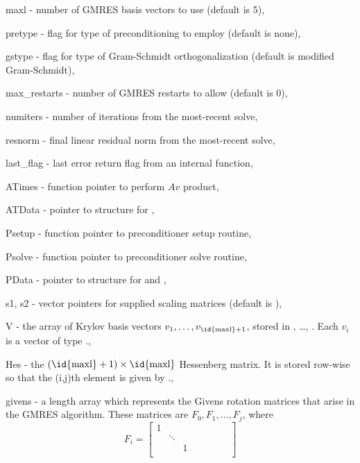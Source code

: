 \begin{args}
  \item[maxl] - number of GMRES basis vectors to use (default is 5),
  \item[pretype] - flag for type of preconditioning to employ
    (default is none),
  \item[gstype] - flag for type of Gram-Schmidt orthogonalization
    (default is modified Gram-Schmidt),
  \item[max\_restarts] - number of GMRES restarts to allow
    (default is 0),
  \item[numiters] - number of iterations from the most-recent solve,
  \item[resnorm] - final linear residual norm from the most-recent solve,
  \item[last\_flag] - last error return flag from an internal function,
  \item[ATimes] - function pointer to perform $Av$ product,
  \item[ATData] - pointer to structure for ,
  \item[Psetup] - function pointer to preconditioner setup routine,
  \item[Psolve] - function pointer to preconditioner solve routine,
  \item[PData] - pointer to structure for  and ,
  \item[s1, s2] - vector pointers for supplied scaling matrices
    (default is ),
  \item[V] - the array of Krylov basis vectors
    $v_1, \ldots, v_{\text{\id{maxl}}+1}$, stored in ,
    \ldots, . Each $v_i$ is a vector of type {\nvector}.,
  \item[Hes] - the $(\text{\id{maxl}}+1)\times\text{\id{maxl}}$
    Hessenberg matrix. It is stored row-wise so that the (i,j)th
    element is given by .,
  \item[givens] - a length  array which represents the
    Givens rotation matrices that arise in the GMRES algorithm. These
    matrices are $F_0, F_1, \ldots, F_j$, where
    \begin{equation*}
    F_i = \begin{bmatrix}
      1 &        &   &     &      &   &        &   \\
        & \ddots &   &     &      &   &        &   \\
        &        & 1 &     &      &   &        &   \\

\end{bmatrix}
\end{equation*}
\end{args}
